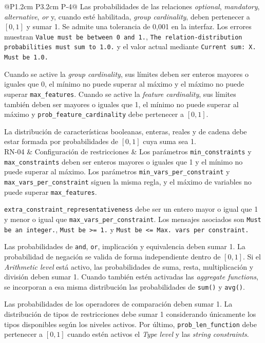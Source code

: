 \begin{longtable}{@{}P{1.2cm} P{3.2cm}
P{\dimexpr\textwidth-4.4cm-4\tabcolsep\relax}@{}}
Las probabilidades de las relaciones \textit{optional}, \textit{mandatory},
\textit{alternative}, \textit{or} y, cuando esté habilitada,
\textit{group cardinality}, deben pertenecer a $[0,1]$ y sumar 1. Se admite
una tolerancia de 0,001 en la interfaz. Los errores muestran
\texttt{Value must be between 0 and 1.},
\texttt{The relation-distribution probabilities must sum to 1.0.} y el valor
actual mediante \texttt{Current sum: X. Must be 1.0.}

Cuando se active la \textit{group cardinality}, sus límites deben ser enteros
mayores o iguales que 0, el mínimo no puede superar al máximo y el máximo no
puede superar \texttt{max\_features}. Cuando se active la
\textit{feature cardinality}, sus límites también deben ser mayores o iguales
que 1, el mínimo no puede superar al máximo y
\texttt{prob\_feature\_cardinality} debe pertenecer a $[0,1]$.

La distribución de características booleanas, enteras, reales y de cadena debe
estar formada por probabilidades de $[0,1]$ cuya suma sea 1.
\\[1em]

RN-04 &
Configuración de restricciones &
Los parámetros \texttt{min\_constraints} y \texttt{max\_constraints} deben ser
enteros mayores o iguales que 1 y el mínimo no puede superar al máximo. Los
parámetros \texttt{min\_vars\_per\_constraint} y
\texttt{max\_vars\_per\_constraint} siguen la misma regla, y el máximo de
variables no puede superar \texttt{max\_features}.

\texttt{extra\_constraint\_representativeness} debe ser un entero mayor o igual
que 1 y menor o igual que \texttt{max\_vars\_per\_constraint}. Los mensajes
asociados son \texttt{Must be an integer.}, \texttt{Must be >= 1.} y
\texttt{Must be <= Max. vars per constraint.}

Las probabilidades de \texttt{and}, \texttt{or}, implicación y equivalencia
deben sumar 1. La probabilidad de negación se valida de forma independiente
dentro de $[0,1]$. Si el \textit{Arithmetic level} está activo, las
probabilidades de suma, resta, multiplicación y división deben sumar 1. Cuando
también estén activadas las \textit{aggregate functions}, se incorporan a esa
misma distribución las probabilidades de \texttt{sum()} y \texttt{avg()}.

Las probabilidades de los operadores de comparación deben sumar 1. La
distribución de tipos de restricciones debe sumar 1 considerando únicamente
los tipos disponibles según los niveles activos. Por último,
\texttt{prob\_len\_function} debe pertenecer a $[0,1]$ cuando estén activos el
\textit{Type level} y las \textit{string constraints}.


\end{longtable}
